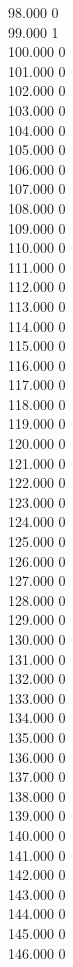 { 98.000	0 \\
 99.000	1 \\
 100.000	0 \\
 101.000	0 \\
 102.000	0 \\
 103.000	0 \\
 104.000	0 \\
 105.000	0 \\
 106.000	0 \\
 107.000	0 \\
 108.000	0 \\
 109.000	0 \\
 110.000	0 \\
 111.000	0 \\
 112.000	0 \\
 113.000	0 \\
 114.000	0 \\
 115.000	0 \\
 116.000	0 \\
 117.000	0 \\
 118.000	0 \\
 119.000	0 \\
 120.000	0 \\
 121.000	0 \\
 122.000	0 \\
 123.000	0 \\
 124.000	0 \\
 125.000	0 \\
 126.000	0 \\
 127.000	0 \\
 128.000	0 \\
 129.000	0 \\
 130.000	0 \\
 131.000	0 \\
 132.000	0 \\
 133.000	0 \\
 134.000	0 \\
 135.000	0 \\
 136.000	0 \\
 137.000	0 \\
 138.000	0 \\
 139.000	0 \\
 140.000	0 \\
 141.000	0 \\
 142.000	0 \\
 143.000	0 \\
 144.000	0 \\
 145.000	0 \\
 146.000	0 \\
}
